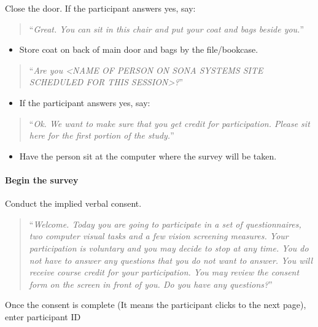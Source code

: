 \documentclass[]{article}
\providecommand{\tightlist}{%
  \setlength{\itemsep}{0pt}\setlength{\parskip}{0pt}}
\let\oldparagraph\paragraph
\renewcommand{\paragraph}[1]{\oldparagraph{#1}\mbox{}}
\begin{document}
Close the door. If the participant answers yes, say:

\begin{quote}
``\emph{Great. You can sit in this chair and put your coat and bags
beside you.}''
\end{quote}

\begin{itemize}
\tightlist
\item
  Store coat on back of main door and bags by the file/bookcase.
\end{itemize}

\begin{quote}
``\emph{Are you \textless{}NAME OF PERSON ON SONA SYSTEMS SITE SCHEDULED
FOR THIS SESSION\textgreater{}?}''
\end{quote}

\begin{itemize}
\tightlist
\item
  If the participant answers yes, say:
\end{itemize}

\begin{quote}
``\emph{Ok. We want to make sure that you get credit for participation.
Please sit here for the first portion of the study.}''
\end{quote}

\begin{itemize}
\tightlist
\item
  Have the person sit at the computer where the survey will be taken.
\end{itemize}

\paragraph{Begin the survey}\label{begin-the-survey}

Conduct the implied verbal consent.

\begin{quote}
``\emph{Welcome. Today you are going to participate in a set of
questionnaires, two computer visual tasks and a few vision screening
measures. Your participation is voluntary and you may decide to stop at
any time. You do not have to answer any questions that you do not want
to answer. You will receive course credit for your participation. You
may review the consent form on the screen in front of you. Do you have
any questions?}''
\end{quote}

Once the consent is complete (It means the participant clicks to the
next page), enter participant ID
\end{document}
